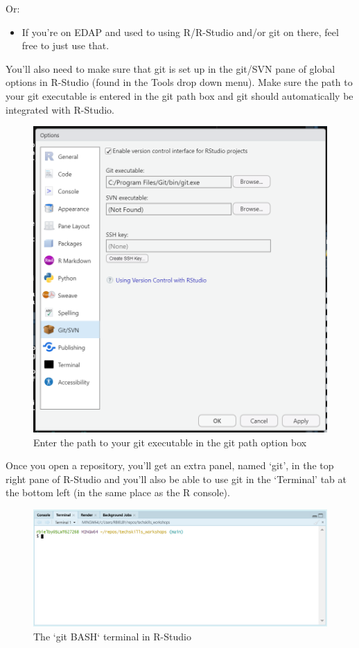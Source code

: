 \documentclass[
  12pt,
]{article}
\providecommand{\tightlist}{%
  \setlength{\itemsep}{0pt}\setlength{\parskip}{0pt}}
\begin{document}
Or:

\begin{itemize}
\tightlist
\item
  If you're on EDAP and used to using R/R-Studio and/or git on there,
  feel free to just use that.
\end{itemize}

You'll also need to make sure that git is set up in the git/SVN pane of
global options in R-Studio (found in the Tools drop down menu). Make
sure the path to your git executable is entered in the git path box and
git should automatically be integrated with R-Studio.

\begin{figure}
\includegraphics[width=0.64\linewidth]{images/gitdemo/gitdemo-gitRstudio-settings} \caption{Enter the path to your git executable in the git path option box}\label{fig:unnamed-chunk-1}
\end{figure}

Once you open a repository, you'll get an extra panel, named `git', in
the top right pane of R-Studio and you'll also be able to use git in the
`Terminal' tab at the bottom left (in the same place as the R console).

\begin{figure}
\includegraphics[width=0.56\linewidth]{images/gitdemo/gitdemo-gitRstudio-NewTerminal} \caption{The `git BASH` terminal in R-Studio}\label{fig:unnamed-chunk-2}
\end{figure}
\end{document}
